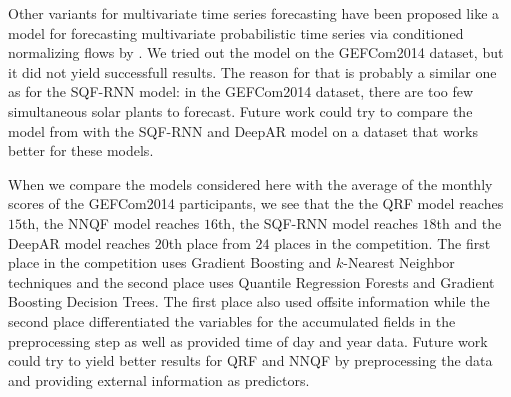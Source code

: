 Other variants for multivariate time series forecasting have been proposed like a model 
for forecasting multivariate probabilistic time series via conditioned normalizing flows 
by \Textcite{Rasul2020}. We tried out the model on the GEFCom2014 dataset, but it did not yield 
successfull results. The reason for that is probably a similar one as for the SQF-RNN model: 
in the GEFCom2014 dataset, there are too few simultaneous solar plants to forecast. 
Future work could try to compare the model from \Textcite{Rasul2020} with the SQF-RNN and DeepAR model 
on a dataset that works better for these models. 

When we compare the models considered here with the average of the monthly scores of the GEFCom2014 
participants, we see that the the QRF model reaches \(15\)th, 
the NNQF model reaches \(16\)th, the SQF-RNN model reaches \(18\)th 
and the DeepAR model reaches \(20\)th place from \(24\) places in the competition. 
The first place in the competition uses Gradient Boosting and \(k\)-Nearest Neighbor techniques 
and the second place uses Quantile Regression Forests and Gradient Boosting Decision Trees. 
The first place also used offsite information while the second place differentiated the variables 
for the accumulated fields in the preprocessing step as well as provided time of day and year data. 
Future work could try to yield better results for QRF and NNQF by preprocessing the data and providing 
external information as predictors. 